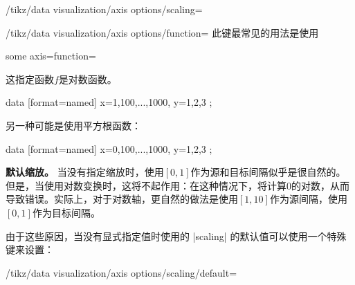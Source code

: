 \begin{key}{/tikz/data visualization/axis options/scaling=}
\begin{key}{/tikz/data visualization/axis options/function=}
        此键最常见的用法是使用
\begin{codeexample}
some axis={function=\pgfdvmathln{\pgfvalue}{\pgfvalue}}
\end{codeexample}
        这指定函数$f$是对数函数。
\begin{codeexample}[preamble={\usetikzlibrary{datavisualization}}]
\tikz \datavisualization
   [scientific axes,
    x axis={ticks={major={at={1,10,100,1000}}},
             scaling=1 at 0cm and 1000 at 3cm,
             function=\pgfdvmathln{\pgfvalue}{\pgfvalue}},
    visualize as scatter]
  data [format=named] {
    x={1,100,...,1000}, y={1,2,3}
  };
\end{codeexample}
        另一种可能是使用平方根函数：
\begin{codeexample}[preamble={\usetikzlibrary{datavisualization}}]
\tikz \datavisualization
   [scientific axes,
    x axis={ticks=few,
            scaling=1 at 0cm and 1000 at 3cm,
            function=\pgfdvmathunaryop{\pgfvalue}{sqrt}{\pgfvalue}},
    visualize as scatter]
  data [format=named] {
    x={0,100,...,1000}, y={1,2,3}
  };
\end{codeexample}
    \end{key}


    \medskip

    \textbf{默认缩放。} 当没有指定缩放时，使用$[0,1]$作为源和目标间隔似乎是很自然的。但是，当使用对数变换时，这将不起作用：在这种情况下，将计算0的对数，从而导致错误。实际上，对于对数轴，更自然的做法是使用$[1,10]$作为源间隔，使用$[0,1]$作为目标间隔。


    由于这些原因，当没有显式指定值时使用的 |scaling| 的默认值可以使用一个特殊键来设置：
    \begin{key}{/tikz/data visualization/axis options/scaling/default=} %


\end{key}
\end{key}

